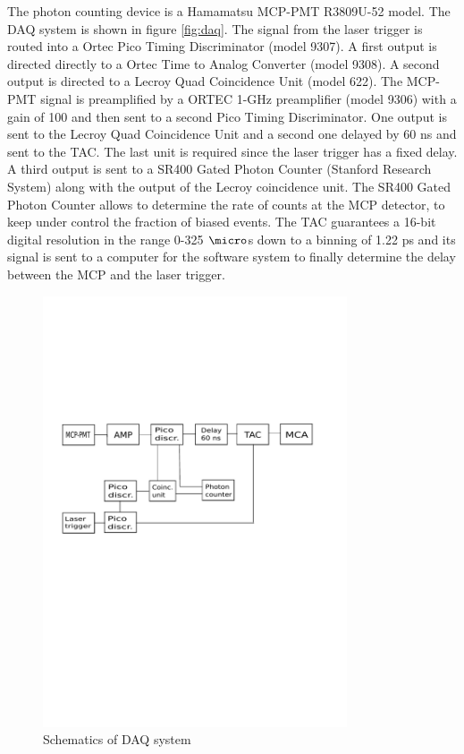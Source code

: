 The photon counting device is a Hamamatsu MCP-PMT R3809U-52 model. The DAQ system is shown in figure \ref{fig:daq}.
The signal from the laser trigger is routed into a Ortec Pico Timing Discriminator (model 9307). A first output is directed directly to a Ortec Time to Analog Converter (model 9308).
A second output is directed to a Lecroy Quad Coincidence Unit (model 622).
The MCP-PMT signal is preamplified by a ORTEC 1-GHz preamplifier (model 9306) with a gain of 100 and then sent to a second Pico Timing Discriminator. One output is sent to the Lecroy Quad Coincidence Unit and a second one delayed by 60 ns and sent to the TAC. The last unit is required since the laser trigger has a fixed delay. 
A third output is sent to a SR400 Gated Photon Counter (Stanford Research System) along with the output of the Lecroy coincidence unit.
The SR400 Gated Photon Counter allows to determine the rate of counts at the MCP detector, to keep under control the fraction of biased events.
The TAC guarantees a 16-bit digital resolution in the range 0-325 $\micro$s down to a binning of 1.22 ps and its signal is sent to a computer for the software system to finally determine the delay between the MCP and the laser trigger.
\begin{figure}[htbp]
\begin{center}
\includegraphics[width=9cm]{../Pictures/Chapter_8/electronics.pdf}
\end{center}
\caption[VUV DAQ]{Schematics of DAQ system}
\label{fig:daw}
\end{figure}

